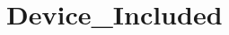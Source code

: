 \hypertarget{group___device___included}{\section{Device\-\_\-\-Included}
\label{group___device___included}
}
